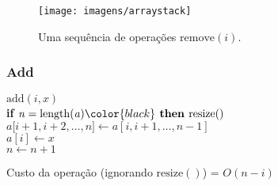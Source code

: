 \documentclass{beamer}
\begin{document}
\begin{frame}
\begin{figure}
  \begin{center}
    \texttt{[image: imagens/arraystack]}
  \end{center}
  \caption[Adding to an ArrayStack]{Uma sequência de operações $\ensuremath{\ensuremath{\mathrm{remove}(\ensuremath{\mathit{i}})}}$.}

\end{figure}
\end{frame}

\begin{frame}
\frametitle{Add}
\begin{oframed}
\begin{flushleft}
\hspace*{1em} $\ensuremath{\mathrm{add}(\ensuremath{\mathit{i}}, \ensuremath{\mathit{x}})}$ \\

\hspace*{1em} \hspace*{1em} {\color{black} \textbf{if}} $\ensuremath{\ensuremath{\mathit{n}} = \mathrm{length}(\ensuremath{\mathit{a}})} {\color{black} \textbf{ then }}  \ensuremath{\mathrm{resize}()}$\\
\hspace*{1em} \hspace*{1em} $\ensuremath{\ensuremath{\mathit{a}}[\ensuremath{\ensuremath{\mathit{i}}+1,\ensuremath{\mathit{i}}+2,\ldots,\ensuremath{n}]} \gets  \ensuremath{\ensuremath{\mathit{a}}[\ensuremath{\ensuremath{\mathit{i}},\ensuremath{\mathit{i}}+1,\ldots,\ensuremath{\mathit{n}}-1}]}}$\\
\hspace*{1em} \hspace*{1em} $\ensuremath{\ensuremath{\mathit{a}}[\ensuremath{i}] \gets  \ensuremath{x}}$\\
\hspace*{1em} \hspace*{1em} $\ensuremath{\ensuremath{\mathit{n}} \gets  \ensuremath{\ensuremath{\mathit{n}} + 1}}$\\
\end{flushleft}
\end{oframed}

Custo da operação (ignorando $\ensuremath{\ensuremath{\mathrm{resize}()}}$) = $O(\ensuremath{\ensuremath{\ensuremath{\mathit{n}}}}-\ensuremath{\ensuremath{\ensuremath{\mathit{i}}}})$
\end{frame}
\end{document}
